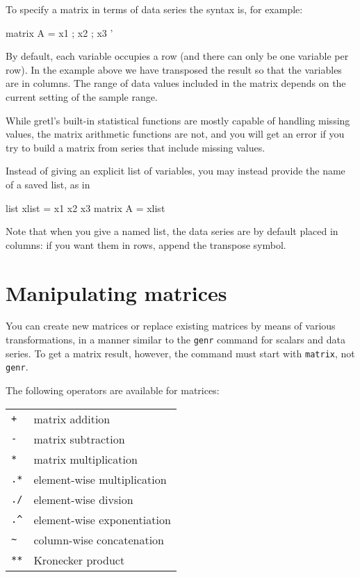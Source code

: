 To specify a matrix in terms of data series the syntax is, for
example:

\begin{code}
matrix A = { x1 ; x2 ; x3 }'
\end{code}

By default, each variable occupies a row (and there can only be one
variable per row).  In the example above we have transposed the result
so that the variables are in columns. The range of data values
included in the matrix depends on the current setting of the sample
range.

While gretl's built-in statistical functions are mostly capable of
handling missing values, the matrix arithmetic functions are not, and
you will get an error if you try to build a matrix from series that
include missing values.

Instead of giving an explicit list of variables, you may instead
provide the name of a saved list, as in

\begin{code}
list xlist = x1 x2 x3
matrix A = { xlist }
\end{code}

Note that when you give a named list, the data series are by default
placed in columns: if you want them in rows, append the transpose
symbol.  

\section{Manipulating matrices}
\label{matrix-manip}

You can create new matrices or replace existing matrices by means of
various transformations, in a manner similar to the \texttt{genr}
command for scalars and data series.  To get a matrix result, however,
the command must start with \texttt{matrix}, not \texttt{genr}.

The following operators are available for matrices:

\begin{center}
\begin{tabular}{ll}
\texttt{+} & matrix addition \\
\texttt{-} & matrix subtraction \\
\texttt{*} & matrix multiplication \\
\texttt{.*} & element-wise multiplication \\
\texttt{./} & element-wise divsion \\
\verb+.^+ & element-wise exponentiation \\
\verb+~+ & column-wise concatenation \\
\texttt{**} & Kronecker product 
\end{tabular}
\end{center}

